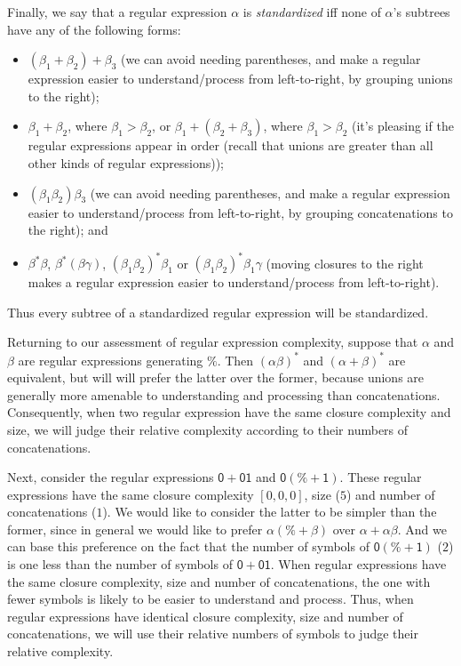 Finally, we say that a regular expression $\alpha$ is \emph{standardized}
%
%
iff none of $\alpha$'s subtrees have any of the following forms:
\begin{itemize}
\item $(\beta_1+\beta_2)+\beta_3$ (we can avoid needing parentheses,
  and make a regular expression easier to understand/process from
  left-to-right, by grouping unions to the right);

\item $\beta_1+\beta_2$, where $\beta_1>\beta_2$, or
  $\beta_1+(\beta_2+\beta_3)$, where $\beta_1>\beta_2$ (it's pleasing
  if the regular expressions appear in order (recall that unions
  are greater than all other kinds of regular expressions));

\item $(\beta_1\beta_2)\beta_3$ (we can avoid needing parentheses, and
  make a regular expression easier to understand/process from
  left-to-right, by grouping concatenations to the right); and

\item $\beta^*\beta$, $\beta^*(\beta\gamma)$,
  $(\beta_1\beta_2)^*\beta_1$ or $(\beta_1\beta_2)^*\beta_1\gamma$
  (moving closures to the right makes a regular expression easier to
  understand/process from left-to-right).
\end{itemize}
Thus every subtree of a standardized regular expression will be standardized.

Returning to our assessment of regular expression complexity, suppose
that $\alpha$ and $\beta$ are regular expressions generating $\%$.
Then $(\alpha\beta)^*$ and $(\alpha+\beta)^*$ are equivalent, but will
will prefer the latter over the former, because unions are generally
more amenable to understanding and processing than concatenations.
Consequently, when two regular expression have the same closure
complexity and size, we will judge their relative complexity
according to their numbers of concatenations.

Next, consider the regular expressions $\mathsf{0 + 01}$ and
$\mathsf{0(\% + 1)}$.  These regular expressions have the same closure
complexity $[0,0,0]$, size ($5$) and number of concatenations ($1$).
We would like to consider the latter to be simpler than the former,
since in general we would like to prefer $\alpha(\%+\beta)$ over
$\alpha + \alpha\beta$.  And we can base this preference on the fact
that the number of symbols of $\mathsf{0(\% + 1)}$ ($2$) is one less
than the number of symbols of $\mathsf{0 + 01}$.  When regular
expressions have the same closure complexity, size and number of
concatenations, the one with fewer symbols is likely to be easier to
understand and process.  Thus, when regular expressions have
identical closure complexity, size and number of concatenations, we
will use their relative numbers of symbols to judge their relative
complexity.


